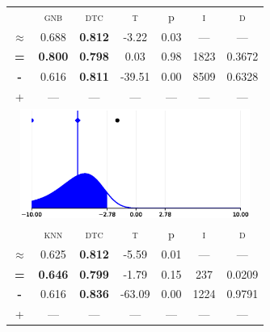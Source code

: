\begin{tabular}{c||cc||c|c|c||c}
\midrule	&\textsc{gnb} & \textsc{dtc} & \textsc{t} & p & \textsc{i} & \textsc{d}\\
	\color{blue} $\approx$ & \color{blue}  0.688 &\color{blue}  \bfseries 0.812 & -3.22 & 0.03 & --- & ---\\\midrule
	{\bfseries\color{black}\tiny=}& \color{black} \bfseries 0.800 & \color{black} \bfseries 0.798 & 0.03 & 0.98 & 1823 & \color{black} 0.3672\\
	{\bfseries\color{blue}\tiny-}& \color{blue}  0.616 & \color{blue} \bfseries 0.811 & -39.51 & 0.00 & 8509 & \color{blue} 0.6328\\
	{\tiny+}& --- & --- & --- & --- & --- & ---\\
	\bottomrule
	\multicolumn{7}{c}{\includegraphics[width=7.5cm, trim=30 0 30 0]{figures/hayes_2.eps}}\\

\midrule	&\textsc{knn} & \textsc{dtc} & \textsc{t} & p & \textsc{i} & \textsc{d}\\
	\color{blue} $\approx$ & \color{blue}  0.625 &\color{blue}  \bfseries 0.812 & -5.59 & 0.01 & --- & ---\\\midrule
	{\bfseries\color{black}\tiny=}& \color{black} \bfseries 0.646 & \color{black} \bfseries 0.799 & -1.79 & 0.15 & 237 & \color{black} 0.0209\\
	{\bfseries\color{blue}\tiny-}& \color{blue}  0.616 & \color{blue} \bfseries 0.836 & -63.09 & 0.00 & 1224 & \color{blue} 0.9791\\
	{\tiny+}& --- & --- & --- & --- & --- & ---\\
\bottomrule\end{tabular}


